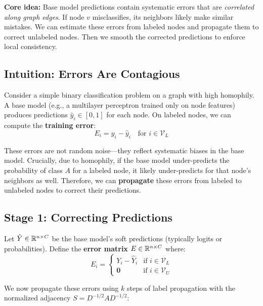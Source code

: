 \begin{notechapter}
\begin{insightbox}
\textbf{Core idea:} Base model predictions contain systematic errors that are
\emph{correlated along graph edges}. If node $v$ misclassifies, its neighbors
likely make similar mistakes. We can estimate these errors from labeled nodes
and propagate them to correct unlabeled nodes. Then we smooth the corrected
predictions to enforce local consistency.
\end{insightbox}

\subsection{Intuition: Errors Are Contagious}

Consider a simple binary classification problem on a graph with high homophily.
A base model (e.g., a multilayer perceptron trained only on node features)
produces predictions $\hat{y}_i \in [0,1]$ for each node. On labeled nodes, we
can compute the \textbf{training error}:
\begin{equation}
E_i = y_i - \hat{y}_i \quad \text{for } i \in \mathcal{V}_L
\end{equation}

These errors are not random noise---they reflect systematic biases in the base
model. Crucially, due to homophily, if the base model under-predicts the
probability of class $A$ for a labeled node, it likely under-predicts for that
node's neighbors as well. Therefore, we can \textbf{propagate} these errors
from labeled to unlabeled nodes to correct their predictions.

\subsection{Stage 1: Correcting Predictions}

Let $\hat{Y} \in \mathbb{R}^{n \times C}$ be the base model's soft predictions
(typically logits or probabilities). Define the \textbf{error matrix}
$E \in \mathbb{R}^{n \times C}$ where:
\begin{equation}
E_{i} = \begin{cases}
Y_i - \hat{Y}_i & \text{if } i \in \mathcal{V}_L \\
\mathbf{0} & \text{if } i \in \mathcal{V}_U
\end{cases}
\end{equation}

We now propagate these errors using $k$ steps of label propagation with the
normalized adjacency $S = D^{-1/2}AD^{-1/2}$:


\end{notechapter}
